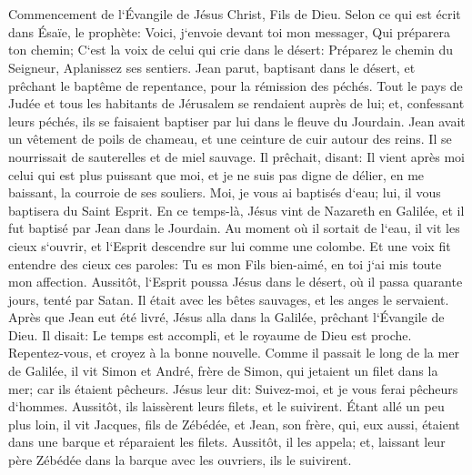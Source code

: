 

\chapter{}

\verse Commencement de l`Évangile de Jésus Christ, Fils de Dieu. 
\verse Selon ce qui est écrit dans Ésaïe, le prophète: Voici, j`envoie devant toi mon messager, Qui préparera ton chemin; 
\verse C`est la voix de celui qui crie dans le désert: Préparez le chemin du Seigneur, Aplanissez ses sentiers. 
\verse Jean parut, baptisant dans le désert, et prêchant le baptême de repentance, pour la rémission des péchés. 
\verse Tout le pays de Judée et tous les habitants de Jérusalem se rendaient auprès de lui; et, confessant leurs péchés, ils se faisaient baptiser par lui dans le fleuve du Jourdain. 
\verse Jean avait un vêtement de poils de chameau, et une ceinture de cuir autour des reins. Il se nourrissait de sauterelles et de miel sauvage. 
\verse Il prêchait, disant: Il vient après moi celui qui est plus puissant que moi, et je ne suis pas digne de délier, en me baissant, la courroie de ses souliers. 
\verse Moi, je vous ai baptisés d`eau; lui, il vous baptisera du Saint Esprit. 
\verse En ce temps-là, Jésus vint de Nazareth en Galilée, et il fut baptisé par Jean dans le Jourdain. 
\verse Au moment où il sortait de l`eau, il vit les cieux s`ouvrir, et l`Esprit descendre sur lui comme une colombe. 
\verse Et une voix fit entendre des cieux ces paroles: Tu es mon Fils bien-aimé, en toi j`ai mis toute mon affection. 
\verse Aussitôt, l`Esprit poussa Jésus dans le désert, 
\verse où il passa quarante jours, tenté par Satan. Il était avec les bêtes sauvages, et les anges le servaient. 
\verse Après que Jean eut été livré, Jésus alla dans la Galilée, prêchant l`Évangile de Dieu. 
\verse Il disait: Le temps est accompli, et le royaume de Dieu est proche. Repentez-vous, et croyez à la bonne nouvelle. 
\verse Comme il passait le long de la mer de Galilée, il vit Simon et André, frère de Simon, qui jetaient un filet dans la mer; car ils étaient pêcheurs. 
\verse Jésus leur dit: Suivez-moi, et je vous ferai pêcheurs d`hommes. 
\verse Aussitôt, ils laissèrent leurs filets, et le suivirent. 
\verse Étant allé un peu plus loin, il vit Jacques, fils de Zébédée, et Jean, son frère, qui, eux aussi, étaient dans une barque et réparaient les filets. 
\verse Aussitôt, il les appela; et, laissant leur père Zébédée dans la barque avec les ouvriers, ils le suivirent. 
